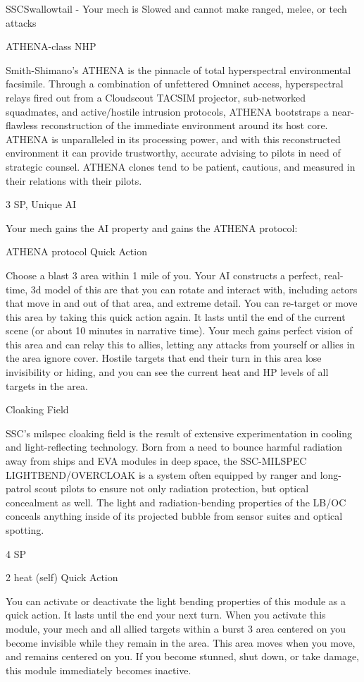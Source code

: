 \begin{mech}{SSC}{Swallowtail}
     -   Your mech is Slowed and cannot make ranged, melee, or tech attacks


ATHENA-class NHP

Smith-Shimano’s ATHENA is the pinnacle of total hyperspectral environmental facsimile. Through a combination of unfettered Omninet access, hyperspectral relays fired out from a Cloudscout TACSIM projector, sub-networked squadmates, and active/hostile intrusion protocols, ATHENA bootstraps a near- flawless reconstruction of the immediate environment around its host core. ATHENA is unparalleled in its processing power, and with this reconstructed environment it can provide trustworthy, accurate advising to pilots in need of strategic counsel. ATHENA clones tend to be patient, cautious, and measured in their relations with their pilots.

3 SP, Unique
AI

Your mech gains the AI property and gains the ATHENA protocol:

ATHENA protocol
Quick Action

Choose a blast 3 area within 1 mile of you. Your AI constructs a perfect, real-time, 3d model of this are that you can rotate and interact with, including actors that move in and out of that area, and extreme detail. You can re-target or move this area by taking this quick action again. It lasts until the end of the current scene (or about 10 minutes in narrative time). Your mech gains perfect vision of this area and can relay this to allies, letting any attacks from yourself or allies in the area ignore cover. Hostile targets that end their turn in this area lose invisibility or hiding, and you can see the current heat and HP levels of all targets in the area.


Cloaking Field

SSC’s milspec cloaking field is the result of extensive experimentation in cooling and light-reflecting technology. Born from a need to bounce harmful radiation away from ships and EVA modules in deep space, the SSC-MILSPEC LIGHTBEND/OVERCLOAK is a system often equipped by ranger and long-patrol scout pilots to ensure not only radiation protection, but optical concealment as well. The light and radiation-bending properties of the LB/OC conceals anything inside of its projected bubble from sensor suites and optical spotting.

4 SP

2 heat (self)
Quick Action

You can activate or deactivate the light bending properties of this module as a quick action. It lasts until the end your next turn. When you activate this module, your mech and all allied targets within a burst 3 area centered on you become invisible while they remain in the area. This area moves when you move, and remains centered on you. If you become stunned, shut down, or take damage, this module immediately becomes inactive.
\end{mech}